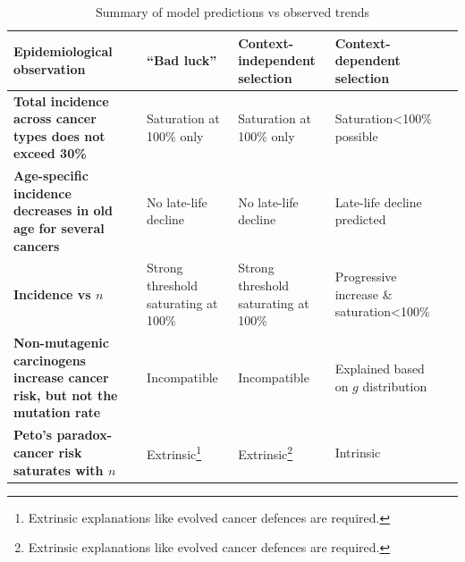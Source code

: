 \documentclass[9pt,onecolumn,twoside]{pnas-new}
\begin{document}
\begin{table}[tbhp]
\centering
\caption{Summary of model predictions vs observed trends}
\label{Table 1}
\begin{tabular}{p{5cm}p{4cm}p{4cm}p{3.5cm}p{7cm}}
\textbf{Epidemiological observation} & ``Bad luck'' & Context-independent selection & Context-dependent selection \\
\midrule
\textbf{Total incidence across cancer types does not exceed 30\%} & Saturation at 100\% only & Saturation at 100\% only & Saturation<100\% possible \\
\textbf{Age-specific incidence decreases in old age for several cancers} & No late-life decline & No late-life decline & Late-life decline predicted \\
\textbf{Incidence vs $n$} & Strong threshold saturating at 100\% & Strong threshold saturating at 100\% & Progressive increase \& saturation<100\% \\
\textbf{Non-mutagenic carcinogens increase cancer risk, but not the mutation rate} & Incompatible & Incompatible & Explained based on $g$ distribution \\
\textbf{Peto's paradox-cancer risk saturates with $n$} & Extrinsic\footnote[1]{Extrinsic explanations like evolved cancer defences are required.} & Extrinsic\footnote[1]{Extrinsic explanations like evolved cancer defences are required.} & Intrinsic \\
\bottomrule
\end{tabular}
\end{table}

\end{document}
